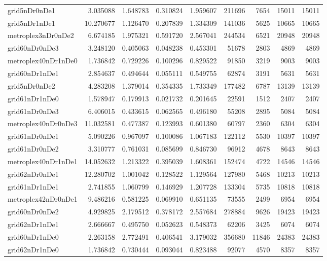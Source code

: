 \begin{longtable}{|l|r|r|r|r|r|r|r|r|}
grid5nDr0nDe1 & 3.035088 & 1.648783 & 0.310824 & 1.959607 & 211696 & 7654 & 15011 & 15011 \\
grid5nDr1nDe1 & 10.270677 & 1.126470 & 0.207839 & 1.334309 & 141036 & 5625 & 10665 & 10665 \\
metroplex3nDr0nDe2 & 6.674185 & 1.975321 & 0.591720 & 2.567041 & 244534 & 6521 & 20948 & 20948 \\
grid60nDr0nDe3 & 3.248120 & 0.405063 & 0.048238 & 0.453301 & 51678 & 2803 & 4869 & 4869 \\
metroplex40nDr1nDe0 & 1.736842 & 0.729226 & 0.100296 & 0.829522 & 91850 & 3219 & 9003 & 9003 \\
grid60nDr1nDe1 & 2.854637 & 0.494644 & 0.055111 & 0.549755 & 62874 & 3191 & 5631 & 5631 \\
grid5nDr0nDe2 & 4.283208 & 1.379014 & 0.354335 & 1.733349 & 177482 & 6787 & 13139 & 13139 \\
grid61nDr1nDe0 & 1.578947 & 0.179913 & 0.021732 & 0.201645 & 22591 & 1512 & 2407 & 2407 \\
grid61nDr0nDe3 & 6.406015 & 0.433615 & 0.062565 & 0.496180 & 55208 & 2895 & 5084 & 5084 \\
metroplex40nDr0nDe3 & 11.032581 & 0.477387 & 0.123993 & 0.601380 & 60797 & 2360 & 6304 & 6304 \\
grid61nDr0nDe1 & 5.090226 & 0.967097 & 0.100086 & 1.067183 & 122112 & 5530 & 10397 & 10397 \\
grid61nDr0nDe2 & 3.310777 & 0.761031 & 0.085699 & 0.846730 & 96912 & 4678 & 8643 & 8643 \\
metroplex40nDr1nDe1 & 14.052632 & 1.213322 & 0.395039 & 1.608361 & 152474 & 4722 & 14546 & 14546 \\
grid62nDr0nDe1 & 12.280702 & 1.001042 & 0.128522 & 1.129564 & 127980 & 5468 & 10213 & 10213 \\
grid61nDr1nDe1 & 2.741855 & 1.060799 & 0.146929 & 1.207728 & 133304 & 5735 & 10818 & 10818 \\
metroplex42nDr0nDe1 & 9.486216 & 0.581225 & 0.069910 & 0.651135 & 73555 & 2499 & 6954 & 6954 \\
grid60nDr0nDe2 & 4.929825 & 2.179512 & 0.378172 & 2.557684 & 278884 & 9626 & 19423 & 19423 \\
grid62nDr1nDe1 & 2.666667 & 0.495750 & 0.052623 & 0.548373 & 62206 & 3425 & 6074 & 6074 \\
grid60nDr1nDe0 & 2.263158 & 2.772491 & 0.406541 & 3.179032 & 356680 & 11846 & 24383 & 24383 \\
grid62nDr1nDe0 & 1.736842 & 0.730444 & 0.093044 & 0.823488 & 92077 & 4570 & 8357 & 8357 \\

\end{longtable}
